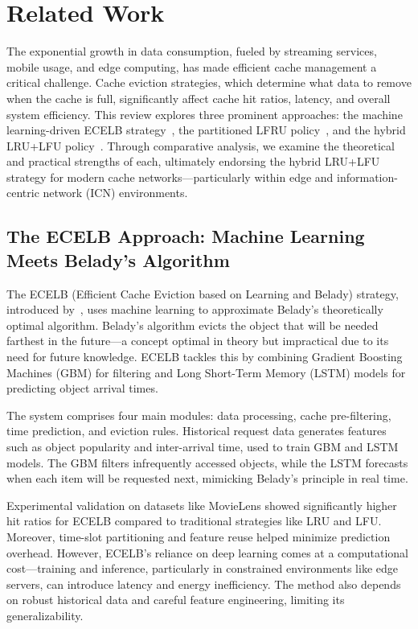 

\section{Related Work\label{sec:related_work}}

The exponential growth in data consumption, fueled by streaming services, mobile usage, and edge computing, has made efficient cache management a critical challenge. 
Cache eviction strategies, which determine what data to remove when the cache is full, significantly affect cache hit ratios, latency, and overall system efficiency. 
This review explores three prominent approaches: the machine learning-driven ECELB strategy~\cite{Zhou2023CacheEviction-LearningBeladyAlgorithm}, the partitioned LFRU policy~\cite{Bilal2017CacheManagementSchemeforEfficientContentEvictionReplication}, and the hybrid LRU+LFU policy~\cite{shah2023ImprovedCacheEviction}. 
Through comparative analysis, we examine the theoretical and practical strengths of each, ultimately endorsing the hybrid LRU+LFU strategy for modern cache networks—particularly within edge and information-centric network (ICN) environments.

\subsection{The ECELB Approach: Machine Learning Meets Belady’s Algorithm}

The ECELB (Efficient Cache Eviction based on Learning and Belady) strategy, introduced by~\cite{Zhou2023CacheEviction-LearningBeladyAlgorithm}, uses machine learning to approximate Belady’s theoretically optimal algorithm. 
Belady’s algorithm evicts the object that will be needed farthest in the future—a concept optimal in theory but impractical due to its need for future knowledge. 
ECELB tackles this by combining Gradient Boosting Machines (GBM) for filtering and Long Short-Term Memory (LSTM) models for predicting object arrival times.

The system comprises four main modules: data processing, cache pre-filtering, time prediction, and eviction rules. Historical request data generates features such as object popularity and inter-arrival time, used to train GBM and LSTM models. The GBM filters infrequently accessed objects, while the LSTM forecasts when each item will be requested next, mimicking Belady’s principle in real time.

Experimental validation on datasets like MovieLens showed significantly higher hit ratios for ECELB compared to traditional strategies like LRU and LFU. Moreover, time-slot partitioning and feature reuse helped minimize prediction overhead. However, ECELB’s reliance on deep learning comes at a computational cost—training and inference, particularly in constrained environments like edge servers, can introduce latency and energy inefficiency. The method also depends on robust historical data and careful feature engineering, limiting its generalizability.

